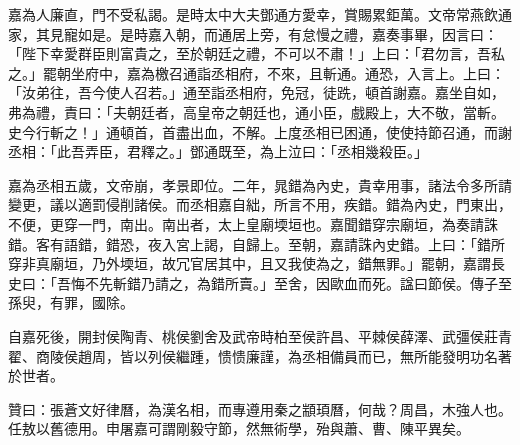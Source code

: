 \begin{pinyinscope}
嘉為人廉直，門不受私謁。是時太中大夫鄧通方愛幸，賞賜累鉅萬。文帝常燕飲通家，其見寵如是。是時嘉入朝，而通居上旁，有怠慢之禮，嘉奏事畢，因言曰：「陛下幸愛群臣則富貴之，至於朝廷之禮，不可以不肅！」上曰：「君勿言，吾私之。」罷朝坐府中，嘉為檄召通詣丞相府，不來，且斬通。通恐，入言上。上曰：「汝弟往，吾今使人召若。」通至詣丞相府，免冠，徒跣，頓首謝嘉。嘉坐自如，弗為禮，責曰：「夫朝廷者，高皇帝之朝廷也，通小臣，戲殿上，大不敬，當斬。史今行斬之！」通頓首，首盡出血，不解。上度丞相已困通，使使持節召通，而謝丞相：「此吾弄臣，君釋之。」鄧通既至，為上泣曰：「丞相幾殺臣。」

嘉為丞相五歲，文帝崩，孝景即位。二年，晁錯為內史，貴幸用事，諸法令多所請變更，議以適罰侵削諸侯。而丞相嘉自絀，所言不用，疾錯。錯為內史，門東出，不便，更穿一門，南出。南出者，太上皇廟堧垣也。嘉聞錯穿宗廟垣，為奏請誅錯。客有語錯，錯恐，夜入宮上謁，自歸上。至朝，嘉請誅內史錯。上曰：「錯所穿非真廟垣，乃外堧垣，故冗官居其中，且又我使為之，錯無罪。」罷朝，嘉謂長史曰：「吾悔不先斬錯乃請之，為錯所賣。」至舍，因歐血而死。諡曰節侯。傳子至孫臾，有罪，國除。

自嘉死後，開封侯陶青、桃侯劉舍及武帝時柏至侯許昌、平棘侯薛澤、武彊侯莊青翟、商陵侯趙周，皆以列侯繼踵，愦愦廉謹，為丞相備員而已，無所能發明功名著於世者。

贊曰：張蒼文好律曆，為漢名相，而專遵用秦之顓頊曆，何哉？周昌，木強人也。任敖以舊德用。申屠嘉可謂剛毅守節，然無術學，殆與蕭、曹、陳平異矣。


\end{pinyinscope}